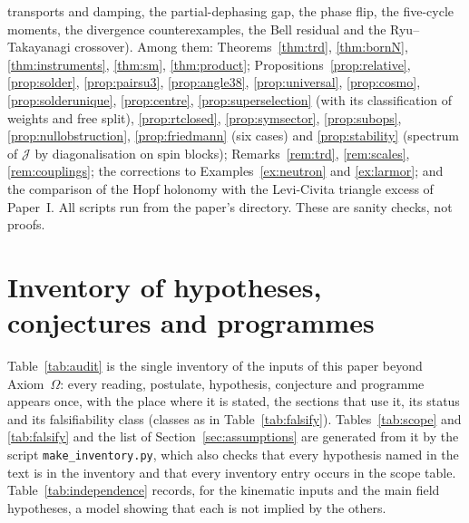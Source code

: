 \documentclass[aps,pra,onecolumn,superscriptaddress,nofootinbib,10pt]{revtex4-2}
\theoremstyle{definition}
\theoremstyle{remark}
\begin{document}
{transports and damping, the partial-dephasing gap, the phase flip, the five-cycle moments, the divergence
counterexamples, the Bell residual and the Ryu--Takayanagi crossover).  Among them: Theorems~\ref{thm:trd}, \ref{thm:bornN}, \ref{thm:instruments}, \ref{thm:sm},
\ref{thm:product}; Propositions~\ref{prop:relative}, \ref{prop:solder}, \ref{prop:pairsu3}, \ref{prop:angle38},
\ref{prop:universal}, \ref{prop:cosmo}, \ref{prop:solderunique}, \ref{prop:centre}, \ref{prop:superselection} (with its
classification of weights and free split), \ref{prop:rtclosed}, \ref{prop:symsector}, \ref{prop:subops},
\ref{prop:nullobstruction}, \ref{prop:friedmann} (six cases) and \ref{prop:stability} (spectrum of $\mathcal J$ by
diagonalisation on spin blocks); Remarks~\ref{rem:trd}, \ref{rem:scales}, \ref{rem:couplings}; the corrections to
Examples~\ref{ex:neutron} and \ref{ex:larmor}; and the comparison of the Hopf holonomy with the Levi-Civita
triangle excess of Paper~I.  All scripts run from the paper's directory.  These are sanity checks, not
proofs.\par}

\appendix
\section{Inventory of hypotheses, conjectures and programmes}\label{app:inventory}
Table~\ref{tab:audit} is the single inventory of the inputs of this paper beyond Axiom~$\Omega$: every reading,
postulate, hypothesis, conjecture and programme appears once, with the place where it is stated, the sections
that use it, its status and its falsifiability class (classes as in Table~\ref{tab:falsify}).  Tables~\ref{tab:scope}
and \ref{tab:falsify} and the list of Section~\ref{sec:assumptions} are generated from it by the script
\texttt{make\_inventory.py}, which also checks that every hypothesis named in the text is in the inventory and that
every inventory entry occurs in the scope table.  Table~\ref{tab:independence} records, for the kinematic inputs and
the main field hypotheses, a model showing that each is not implied by the others.
\end{document}
